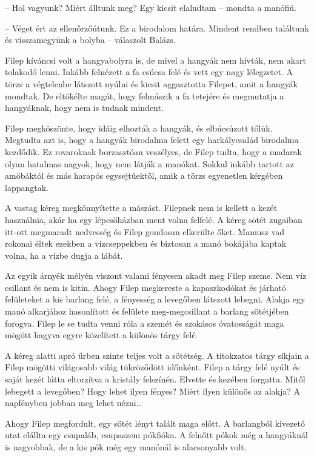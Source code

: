 \documentclass[10pt]{memoir}
\begin{document}
-- Hol vagyunk? Miért álltunk meg? Egy kicsit elaludtam -- mondta a manófiú.

-- Véget ért az ellenőrzőútunk. Ez a birodalom határa. Mindent rendben
találtunk és visszamegyünk a bolyba -- válaszolt Balázs.

Filep kíváncsi volt a hangyabolyra is, de mivel a hangyák nem hívták, nem akart
tolakodó lenni. Inkább felnézett a fa csúcsa felé és vett egy nagy lélegzetet.
A törzs a végtelenbe látszott nyúlni és kicsit aggasztotta Filepet, amit a
hangyák mondtak. De eltökélte magát, hogy felmászik a fa tetejére és megmutatja
a hangyáknak, hogy nem is tudnak mindent.

Filep megköszönte, hogy idáig elhozták a hangyák, és elbúcsúzott tőlük.
Megtudta azt is, hogy a hangyák birodalma felett egy harkálycsalád birodalma
kezdődik. Ez rovaroknak borzasztóan veszélyes, de Filep tudta, hogy a madarak
olyan hatalmas nagyok, hogy nem látják a manókat. Sokkal inkább tartott az
amőbáktól és más harapós egysejtűektől, amik a törzs egyenetlen kérgében
lappangtak.

A vastag kéreg megkönnyítette a mászást. Filepnek nem is kellett a kezét
használnia, akár ha egy lépcsőházban ment volna felfelé. A kéreg sötét zugaiban
itt-ott megmaradt nedvesség és Filep gondosan elkerülte őket. Mamusz vad
rokonai éltek ezekben a vízcseppekben és biztosan a manó bokájába kaptak volna,
ha a vízbe dugja a lábát.

Az egyik árnyék mélyén viszont valami fényesen akadt meg Filep szeme. Nem víz
csillant és nem is kitin. Ahogy Filep megkereste a kapaszkodókat és járható
felületeket a kis barlang felé, a fényesség a levegőben látszott lebegni.
Alakja egy manó alkarjához hasonlított és felülete meg-megcsillant a barlang
sötétjében forogva. Filep le se tudta venni róla a szemét és szokásos
óvatosságát maga mögött hagyva egyre közelített a különös tárgy felé.

A kéreg alatti apró űrben szinte teljes volt a sötétség. A titokzatos tárgy
síkjain a Filep mögötti világosabb világ tükröződött időnként. Filep a tárgy
felé nyúlt és saját kezét látta eltorzítva a kristály felszínén. Elvette és
kezében forgatta. Mitől lebegett a levegőben? Hogy lehet ilyen fényes? Miért
ilyen különös az alakja? A napfényben jobban meg lehet nézni\dots

Ahogy Filep megfordult, egy sötét lényt talált maga előtt. A barlangból
kivezető utat elállta egy csupaláb, csupaszem pókfióka. A felnőtt pókok még a
hangyáknál is nagyobbak, de a kis pók még egy manónál is alacsonyabb volt.
\end{document}
